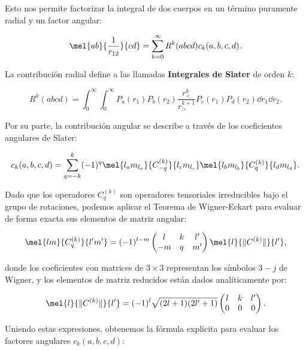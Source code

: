 Esto nos permite factorizar la integral de dos cuerpos en un término puramente radial y un factor angular:

\begin{equation}
  \mel{ab}{\frac{1}{r_{12}}}{cd} = \sum_{k=0}^{\infty} R^k(abcd) c_k(a,b,c,d).
\end{equation}

La contribución radial define a las llamadas \textbf{Integrales de Slater} de orden \( k \):

\begin{equation}
  \label{eq:slater-integral}
  R^k(abcd) = \int_0^\infty \int_0^\infty P_a(r_1) P_b(r_2) \frac{r_{<}^k}{r_{>}^{k+1}} P_c(r_1) P_d(r_2) \dd{r_1} \dd{r_2}.
\end{equation}

Por su parte, la contribución angular se describe a través de los coeficientes angulares de Slater:

\begin{equation}
  c_k(a,b,c,d) = \sum_{q=-k}^k (-1)^q \mel{l_a m_{l_a}}{C_{-q}^{(k)}}{l_c m_{l_c}} \mel{l_b m_{l_b}}{C_q^{(k)}}{l_d m_{l_d}}.
\end{equation}

Dado que los operadores \( C_{q}^{(k)} \) son operadores tensoriales irreducibles bajo el grupo de rotaciones, podemos aplicar el Teorema de Wigner-Eckart para evaluar de forma exacta sus elementos de matriz angular:

\begin{equation}
  \mel{lm}{C_{q}^{(k)}}{l'm'} = (-1)^{l-m} \begin{pmatrix} l & k & l' \\ -m & q & m' \end{pmatrix} \mel{l}{\|C^{(k)}\|}{l'},
\end{equation}

donde los coeficientes con matrices de \( 3 \times 3 \) representan los símbolos \( 3-j \) de Wigner, y los elementos de matriz reducidos están dados analíticamente por:

\begin{equation}
  \mel{l}{\|C^{(k)}\|}{l'} = (-1)^l \sqrt{(2l+1)(2l'+1)} \begin{pmatrix} l & k & l' \\ 0 & 0 & 0 \end{pmatrix}.
\end{equation}

Uniendo estas expresiones, obtenemos la fórmula explícita para evaluar los factores angulares \( c_k(a,b,c,d) \):

